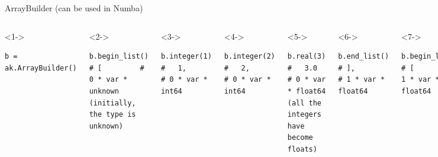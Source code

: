 \documentclass[aspectratio=169]{beamer}
\begin{document}
\begin{frame}[fragile]{ArrayBuilder (can be used in Numba)}
\vspace{0.1 cm}
\scriptsize
\begin{columns}
\begin{uncoverenv}<1->
\begin{verbatim}
b = ak.ArrayBuilder()
\end{verbatim}
\end{uncoverenv}
\vspace{-0.25 cm}
\begin{uncoverenv}<2->
\begin{verbatim}
b.begin_list()    # [         # 0 * var * unknown     (initially, the type is unknown)
\end{verbatim}
\end{uncoverenv}
\vspace{-0.43 cm}
\begin{uncoverenv}<3->
\begin{verbatim}
b.integer(1)      #   1,      # 0 * var * int64
\end{verbatim}
\end{uncoverenv}
\vspace{-0.43 cm}
\begin{uncoverenv}<4->
\begin{verbatim}
b.integer(2)      #   2,      # 0 * var * int64
\end{verbatim}
\end{uncoverenv}
\vspace{-0.43 cm}
\begin{uncoverenv}<5->
\begin{verbatim}
b.real(3)         #   3.0     # 0 * var * float64     (all the integers have become floats)
\end{verbatim}
\end{uncoverenv}
\vspace{-0.43 cm}
\begin{uncoverenv}<6->
\begin{verbatim}
b.end_list()      # ],        # 1 * var * float64
\end{verbatim}
\end{uncoverenv}
\vspace{-0.43 cm}
\begin{uncoverenv}<7->
\begin{verbatim}
b.begin_list()    # [         # 1 * var * float64
\end{verbatim}
\end{uncoverenv}

\end{columns}
\end{frame}
\end{document}
